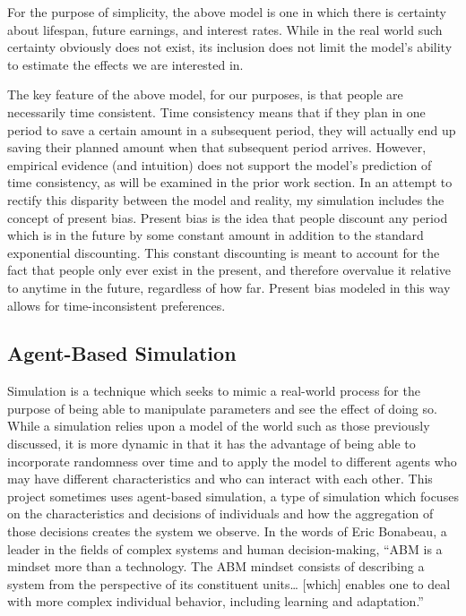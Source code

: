 \documentclass[10pt,twocolumn]{article}
\begin{document}
For the purpose of simplicity, the above model is one in which there is certainty about lifespan, future earnings, and interest rates. While in the real world such certainty obviously does not exist, its inclusion does not limit the model's ability to estimate the effects we are interested in.

The key feature of the above model, for our purposes, is that people are necessarily time consistent. Time consistency means that if they plan in one period to save a certain amount in a subsequent period, they will actually end up saving their planned amount when that subsequent period arrives. However, empirical evidence (and intuition) does not support the model’s prediction of time consistency, as will be examined in the prior work section. In an attempt to rectify this disparity between the model and reality, my simulation includes the concept of present bias. Present bias is the idea that people discount any period which is in the future by some constant amount in addition to the standard exponential discounting. This constant discounting is meant to account for the fact that people only ever exist in the present, and therefore overvalue it relative to anytime in the future, regardless of how far. Present bias modeled in this way allows for time-inconsistent preferences.  


\subsection{Agent-Based Simulation}
Simulation is a technique which seeks to mimic a real-world process for the purpose of being able to manipulate parameters and see the effect of doing so. While a simulation relies upon a model of the world such as those previously discussed, it is more dynamic in that it has the advantage of being able to incorporate randomness over time and to apply the model to different agents who may have different characteristics and who can interact with each other. This project sometimes uses agent-based simulation, a type of simulation which focuses on the characteristics and decisions of individuals and how the aggregation of those decisions creates the system we observe. In the words of Eric Bonabeau, a leader in the fields of complex systems and human decision-making, “ABM is a mindset more than a technology. The ABM mindset consists of describing a system from the perspective of its constituent units… [which] enables one to deal with more complex individual behavior, including learning and adaptation.”\cite{bonabeau}
\end{document}

